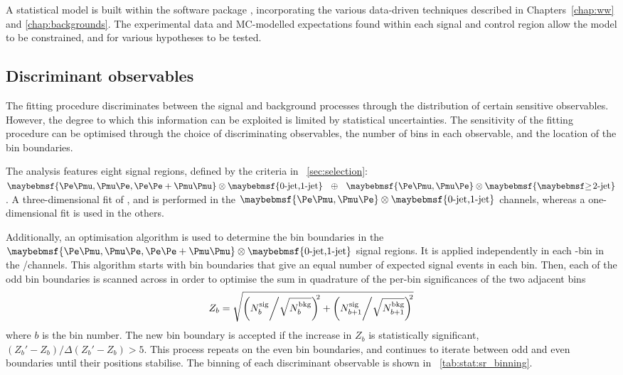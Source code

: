 
A statistical model is built within the \histfactory software package \cite{HistFactory}, 
incorporating the various data-driven techniques described in Chapters~\ref{chap:ww} and 
\ref{chap:backgrounds}. The experimental data and MC-modelled expectations found within each 
signal and control region allow the model to be constrained, and for various hypotheses to 
be tested.



\subsection{Discriminant observables}
\label{sec:stat:sr_binning}

The fitting procedure discriminates between the signal and background processes through the 
distribution of certain sensitive observables. However, the degree to which this information 
can be exploited is limited by statistical uncertainties. The sensitivity of the fitting 
procedure can be optimised through the choice of discriminating observables, the number of 
bins in each observable, and the location of the bin boundaries.

The analysis features eight signal regions, defined by the criteria in 
\Section~\ref{sec:selection}: $\braces{\emch,\mech,\eech{}+\mmch} \otimes 
\braces{\text{0-jet,1-jet}}~~\oplus~~\braces{\emch,\mech} \otimes \braces{\twojet}$.
A three-dimensional fit of \mt, \ptsubleadlep and \mll is performed in the 
$\braces{\emch,\mech} \otimes \braces{\text{0-jet,1-jet}}$ channels, whereas a 
one-dimensional \mt fit is used in the others.

Additionally, an optimisation algorithm is used to determine the \mt bin boundaries in the 
$\braces{\emch,\mech,\eech{}+\mmch} \otimes \braces{\text{0-jet,1-jet}}$ signal regions. 
It is applied independently in each \ptsubleadlep-\mll bin in the \emch/\mech channels. 
This algorithm starts with bin boundaries that give an equal number of expected signal 
events in each bin. Then, each of the odd bin boundaries is scanned across \mt in order to 
optimise the sum in quadrature of the per-bin significances of the two adjacent bins
\begin{equation}
	Z_b = \sqrt{\left(N_{b}^{\text{sig}} \middle/ \sqrt{N_{b}^{\text{bkg}}}\right)^{\!\!2} + \left(N_{b+1}^{\text{sig}} \middle/ \sqrt{N_{b+1}^{\text{bkg}}}\right)^{\!\!2}}
\end{equation}
where $b$ is the bin number. The new bin boundary is accepted if the increase in $Z_b$ is 
statistically significant, \ie $(Z_b' - Z_b)/\Delta(Z_b' - Z_b) > 5$. This process repeats 
on the even bin boundaries, and continues to iterate between odd and even boundaries until 
their positions stabilise.
The binning of each discriminant observable is shown in \Table~\ref{tab:stat:sr_binning}.

